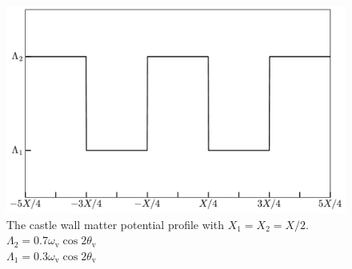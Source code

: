 \begin{figure}[!htbp]
    \centering
    \includegraphics[width=\columnwidth]{chapters/assets/rabi/castlewall-profile}
    \caption{The castle wall matter potential profile with $X_1=X_2=X/2$. $\Lambda_2 =0.7\omega_{\mathrm v} \cos 2\theta_{\mathrm v} $ \\  $\Lambda_1 = 0.3\omega_{\mathrm v} \cos 2\theta_{\mathrm v}$}
    \label{fig-castlewall-profile-illustration}
\end{figure}





